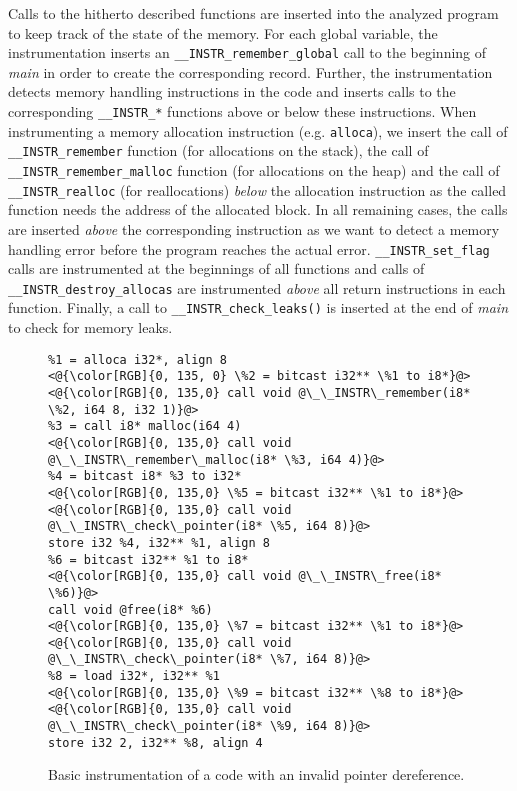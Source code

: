 Calls to the hitherto described functions are inserted into the analyzed
program to keep track of the state of the memory. For each global variable, the
instrumentation inserts an \texttt{\_\_INSTR\_remember\_global} call to the
beginning of \emph{main} in order to create the corresponding record. Further,
the instrumentation detects memory handling instructions in the code and
inserts calls to the corresponding \texttt{\_\_INSTR\_*} functions above or
below these instructions. When instrumenting a memory allocation instruction
(e.g. \texttt{alloca}), we insert the call of \texttt{\_\_INSTR\_remember}
function (for allocations on the stack), the call of
\texttt{\_\_INSTR\_remember\_malloc} function (for allocations on the heap) and
the call of \texttt{\_\_INSTR\_realloc} (for reallocations) \emph{below} the
allocation instruction as the called function needs the address of the
allocated block. In all remaining cases, the calls are inserted \emph{above}
the corresponding instruction as we want to detect a memory handling error
before the program reaches the actual error. \texttt{\_\_INSTR\_set\_flag}
calls  are instrumented at the beginnings of all functions and calls of
\texttt{\_\_INSTR\_destroy\_allocas} are instrumented \emph{above} all return
instructions in each function. Finally, a call to
\texttt{\_\_INSTR\_check\_leaks()} is inserted at the end of \emph{main} to
check for memory leaks.

\begin{figure}[t]
\begin{lstlisting}
%1 = alloca i32*, align 8
<@{\color[RGB]{0, 135, 0} \%2 = bitcast i32** \%1 to i8*}@>
<@{\color[RGB]{0, 135,0} call void @\_\_INSTR\_remember(i8* \%2, i64 8, i32 1)}@>
%3 = call i8* malloc(i64 4)
<@{\color[RGB]{0, 135,0} call void @\_\_INSTR\_remember\_malloc(i8* \%3, i64 4)}@>
%4 = bitcast i8* %3 to i32*
<@{\color[RGB]{0, 135,0} \%5 = bitcast i32** \%1 to i8*}@>
<@{\color[RGB]{0, 135,0} call void @\_\_INSTR\_check\_pointer(i8* \%5, i64 8)}@>
store i32 %4, i32** %1, align 8
%6 = bitcast i32** %1 to i8*
<@{\color[RGB]{0, 135,0} call void @\_\_INSTR\_free(i8* \%6)}@>
call void @free(i8* %6)
<@{\color[RGB]{0, 135,0} \%7 = bitcast i32** \%1 to i8*}@>
<@{\color[RGB]{0, 135,0} call void @\_\_INSTR\_check\_pointer(i8* \%7, i64 8)}@>
%8 = load i32*, i32** %1
<@{\color[RGB]{0, 135,0} \%9 = bitcast i32** \%8 to i8*}@>
<@{\color[RGB]{0, 135,0} call void @\_\_INSTR\_check\_pointer(i8* \%9, i64 8)}@>
store i32 2, i32** %8, align 4
\end{lstlisting}
\caption{Basic instrumentation of a code with an invalid pointer
  dereference.}
\label{fig:example1}
\end{figure}

